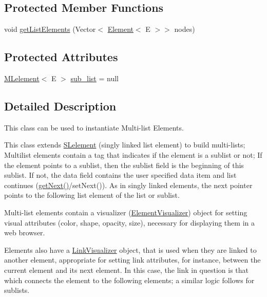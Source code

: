 \subsection*{Protected Member Functions}
\begin{DoxyCompactItemize}
\item 
void \mbox{\hyperlink{classbridges_1_1base_1_1_m_lelement_a496378739f031ef451a6ab1f63c5770f}{get\+List\+Elements}} (Vector$<$ \mbox{\hyperlink{classbridges_1_1base_1_1_element}{Element}}$<$ E $>$$>$ nodes)
\end{DoxyCompactItemize}
\subsection*{Protected Attributes}
\begin{DoxyCompactItemize}
\item 
\mbox{\hyperlink{classbridges_1_1base_1_1_m_lelement}{M\+Lelement}}$<$ E $>$ \mbox{\hyperlink{classbridges_1_1base_1_1_m_lelement_a7dee2985f9a8134d3076eb9478422403}{sub\+\_\+list}} = null
\end{DoxyCompactItemize}


\subsection{Detailed Description}
This class can be used to instantiate Multi-\/list Elements. 

This class extends \mbox{\hyperlink{classbridges_1_1base_1_1_s_lelement}{S\+Lelement}} (singly linked list element) to build multi-\/lists; Multilist elements contain a tag that indicates if the element is a sublist or not; If the element points to a sublist, then the sublist field is the beginning of this sublist. If not, the data field contains the user specified data item and list continues (\mbox{\hyperlink{classbridges_1_1base_1_1_m_lelement_a52ddc26a69eccda5f5b57b94cf87a545}{get\+Next()}}/set\+Next()). As in singly linked elements, the next pointer points to the following list element of the list or sublist.

Multi-\/list elements contain a visualizer (\mbox{\hyperlink{classbridges_1_1base_1_1_element_visualizer}{Element\+Visualizer}}) object for setting visual attributes (color, shape, opacity, size), necessary for displaying them in a web browser.

Elements also have a \mbox{\hyperlink{classbridges_1_1base_1_1_link_visualizer}{Link\+Visualizer}} object, that is used when they are linked to another element, appropriate for setting link attributes, for instance, between the current element and its next element. In this case, the link in question is that which connects the element to the following elements; a similar logic follows for sublists.

